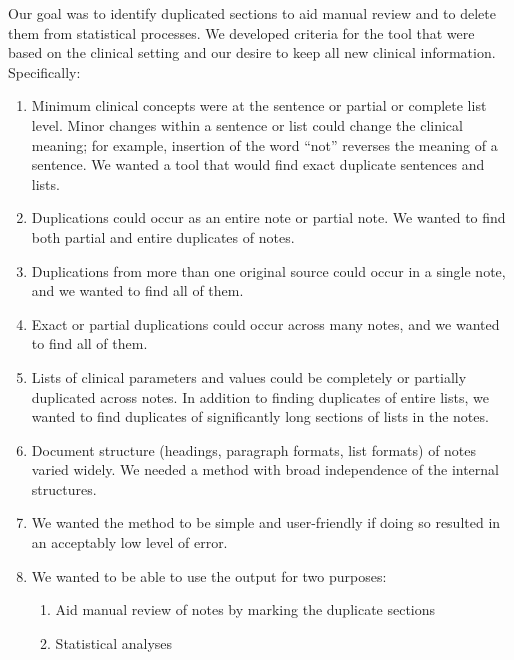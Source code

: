 \documentclass[runningheads,a4paper]{llncs}
\begin{document}
\noindent Our goal was to identify duplicated sections to aid manual review and to delete them from statistical processes. We developed criteria for the tool that were based on the clinical setting and our desire to keep all new clinical information. Specifically:


\begin{enumerate}
\item
Minimum clinical concepts were at the sentence or partial or complete list level.  Minor changes within a sentence or list could change the clinical meaning; for example, insertion of the word “not” reverses the meaning of a sentence. We wanted a tool that would find exact duplicate sentences and lists.
\medskip

\item
Duplications could occur as an entire note or partial note. We wanted to find both partial and entire duplicates of notes.
\medskip

\item
Duplications from more than one original source could occur in a single note, and we wanted to find all of them.
\medskip

\item
Exact or partial duplications could occur across many notes, and we wanted to find all of them.
\medskip

\item
Lists of clinical parameters and values could be completely or partially duplicated across notes. In addition to finding duplicates of entire lists, we wanted to find duplicates of significantly long sections of lists in the notes.
\medskip

\item
Document structure (headings, paragraph formats, list formats) of notes varied widely. We needed a method with broad independence of the internal structures.
\medskip

\item
We wanted the method to be simple and user-friendly if doing so resulted in an acceptably low level of error.
\medskip

\item
We wanted to be able to use the output for two purposes:
\begin{enumerate}
\item
Aid manual review of notes by marking the duplicate sections
\medskip

\item
Statistical analyses
\end{enumerate}
\end{enumerate}    
\end{document}
